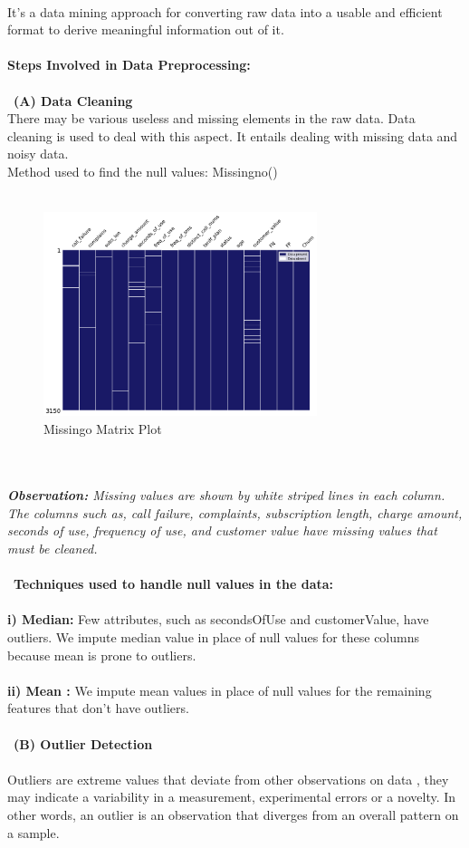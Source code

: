 \documentclass[a4paper, 10pt, conference]{ieeeconf}      %
\begin{document}
\\It's a data mining approach for converting raw data into a usable and efficient format to derive meaningful information out of it.
\\\
\\
\textbf{Steps Involved in Data Preprocessing:} 
\\
\\\
\textbf{(A) Data Cleaning} 
\\There may be various useless and missing elements in the raw data. Data cleaning is used to deal with this aspect. It entails dealing with missing data and noisy data.
\\ Method used to find the null values: Missingno()
\\
\\
\begin{figure}[htp]
    \centering
    \includegraphics[width=8cm,height=6cm]{Images/missing_Plot.png}
    \caption{Missingo Matrix Plot}
    \label{fig:MissingnoBarPlot}
\end{figure}
\\\
\\
\textit{\textbf{Observation:} Missing values are shown by white striped lines in each column. The columns such as, call failure, complaints, subscription length, charge amount, seconds of use, frequency of use, and customer value have missing values that must be cleaned.}
\\\
\\\
\textbf{Techniques used to handle null values in the data:}
\\
\\\textbf{i) Median:} Few attributes, such as {secondsOfUse} and {customerValue}, have outliers. We impute median value in place of null values for these columns because mean is prone to outliers.
\\\
\\\textbf{ii) Mean :} We impute mean values in place of  null values for the remaining features that don't have outliers.
\\\
\\\
\textbf{(B) Outlier Detection}
\\\
\\Outliers are extreme values that deviate from other observations on data , they may indicate a variability in a measurement, experimental errors or a novelty. In other words, an outlier is an observation that diverges from an overall pattern on a sample.
\end{document}
